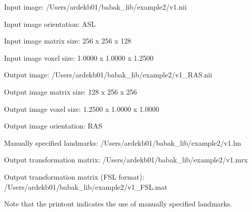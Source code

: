 \documentclass[11pt]{article}
\begin{document}

Input image: /Users/ardekb01/babak\_lib/example2/v1.nii

Input image orientation: ASL

Input image matrix size: 256 x 256 x 128

Input image voxel size: 1.0000 x 1.0000 x 1.2500

Output image: /Users/ardekb01/babak\_lib/example2/v1\_RAS.nii

Output image matrix size: 128 x 256 x 256

Output image voxel size: 1.2500 x 1.0000 x 1.0000

Output image orientation: RAS

Manually specified landmarks: /Users/ardekb01/babak\_lib/example2/v1.lm

Output transformation matrix: /Users/ardekb01/babak\_lib/example2/v1.mrx

Output transformation matrix (FSL format): /Users/ardekb01/babak\_lib/example2/v1\_FSL.mat 

\noindent Note that the printout indicates the use of manually specified landmarks.

\end{document}
